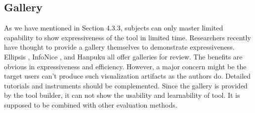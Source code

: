 \subsection{Gallery}
As we have mentioned in Section 4.3.3, subjects can only master limited capability to show expressiveness of the tool in limited time. Researchers recently have thought to provide a gallery themselves to demonstrate expressiveness. Ellipsis \cite{Satyanarayan2014}, InfoNice \cite{Wang2018}, and Hanpuku \cite{Bigelow2017} all offer galleries for review. The benefits are obvious in expressiveness and efficiency.  However, a major concern might be the target users can’t produce such visualization artifacts as the authors do. Detailed tutorials and instruments should be complemented. Since the gallery is provided by the tool builder, it can not show the usability and learnability of tool. It is supposed to be combined with other evaluation methods. 


 \newpage

